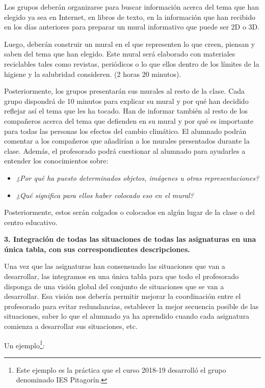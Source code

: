 \documentclass[
]{article}
\providecommand{\tightlist}{%
  \setlength{\itemsep}{0pt}\setlength{\parskip}{0pt}}
\begin{document}
Los grupos deberán organizarse para buscar información acerca del tema
que han elegido ya sea en Internet, en libros de texto, en la
información que han recibido en los días anteriores para preparar un
mural informativo que puede ser 2D o 3D.

Luego, deberán construir un mural en el que representen lo que creen,
piensan y saben del tema que han elegido. Este mural será elaborado con
materiales reciclables tales como revistas, periódicos o lo que ellos
dentro de los límites de la higiene y la salubridad consideren. (2 horas
20 minutos).

Posteriormente, los grupos presentarán sus murales al resto de la clase.
Cada grupo dispondrá de 10 minutos para explicar su mural y por qué han
decidido reflejar así el tema que les ha tocado. Han de informar también
al resto de los compañeros acerca del tema que defienden en su mural y
por qué es importante para todas las personas los efectos del cambio
climático. El alumnado podrán comentar a los compañeros que añadirían a
los murales presentados durante la clase. Además, el profesorado podrá
cuestionar al alumnado para ayudarles a entender los conocimientos
sobre:

\begin{itemize}
\tightlist
\item
  \emph{¿Por qué ha puesto determinados objetos, imágenes u otras
  representaciones?}
\item
  \emph{¿Qué significa para ellos haber colocado eso en el mural?}
\end{itemize}

Posteriormente, estos serán colgados o colocados en algún lugar de la
clase o del centro educativo.

\textbf{3. Integración de todas las situaciones de todas las asignaturas
en una única tabla, con sus correspondientes descripciones.}

Una vez que las asignaturas han consensuado las situaciones que van a
desarrollar, las integramos en una única tabla para que todo el
profesorado disponga de una visión global del conjunto de situaciones
que se van a desarrollar. Esa visión nos debería permitir mejorar la
coordinación entre el profesorado para evitar redundancias, establecer
la mejor secuencia posible de las situaciones, saber lo que el alumnado
ya ha aprendido cuando cada asignatura comienza a desarrollar sus
situaciones, etc.

\texttt{}Un ejemplo\footnote{Este ejemplo es la práctica que el curso
  2018-19 desarrolló el grupo denominado IES Pitagorín.}:
\end{document}

